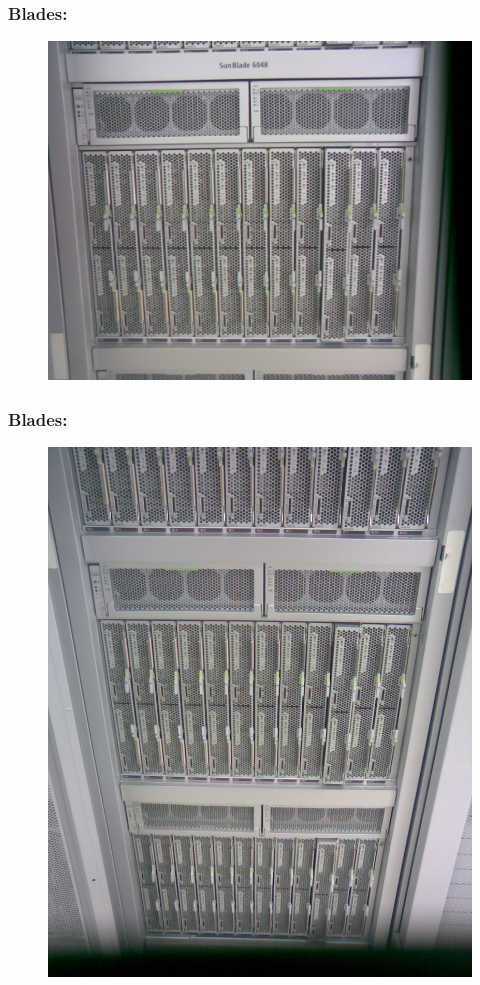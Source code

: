 \documentclass[10pt]{beamer}
\begin{document}
		\begin{frame}%
		\frametitle{Blades:}
			\begin{figure}
			\centering
				\includegraphics[scale=0.15]{./figuras/gaveta_blades.jpg}
			\end{figure}
		\end{frame}

		\begin{frame}%
		\frametitle{Blades:}
			\begin{figure}
			\centering
				\includegraphics[scale=0.15]{./figuras/rack.jpg}
			\end{figure}
		\end{frame}
\end{document}
